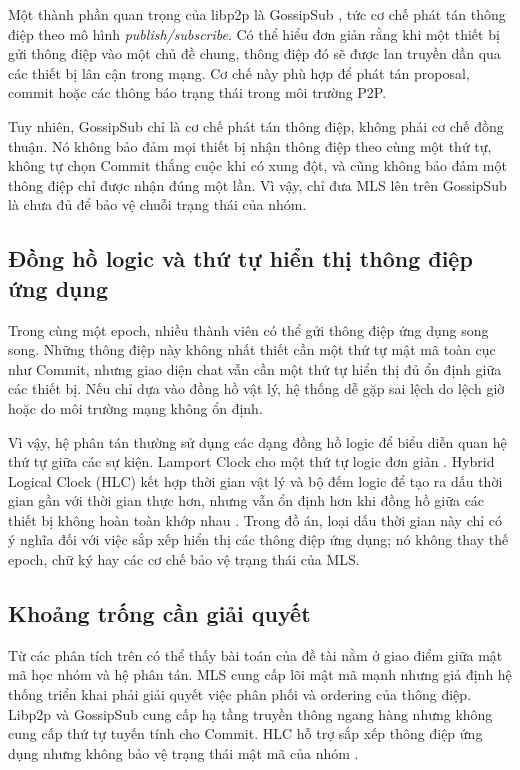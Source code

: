 \documentclass[../DoAn.tex]{subfiles}
\begin{document}
Một thành phần quan trọng của libp2p là GossipSub \cite{vyzovitis2020gossipsub}, tức cơ chế phát tán thông điệp theo mô hình \textit{publish/subscribe}. Có thể hiểu đơn giản rằng khi một thiết bị gửi thông điệp vào một chủ đề chung, thông điệp đó sẽ được lan truyền dần qua các thiết bị lân cận trong mạng. Cơ chế này phù hợp để phát tán proposal, commit hoặc các thông báo trạng thái trong môi trường P2P.

Tuy nhiên, GossipSub chỉ là cơ chế phát tán thông điệp, không phải cơ chế đồng thuận. Nó không bảo đảm mọi thiết bị nhận thông điệp theo cùng một thứ tự, không tự chọn Commit thắng cuộc khi có xung đột, và cũng không bảo đảm một thông điệp chỉ được nhận đúng một lần. Vì vậy, chỉ đưa MLS lên trên GossipSub là chưa đủ để bảo vệ chuỗi trạng thái của nhóm.

\subsection{Đồng hồ logic và thứ tự hiển thị thông điệp ứng dụng}

Trong cùng một epoch, nhiều thành viên có thể gửi thông điệp ứng dụng song song. Những thông điệp này không nhất thiết cần một thứ tự mật mã toàn cục như Commit, nhưng giao diện chat vẫn cần một thứ tự hiển thị đủ ổn định giữa các thiết bị. Nếu chỉ dựa vào đồng hồ vật lý, hệ thống dễ gặp sai lệch do lệch giờ hoặc do môi trường mạng không ổn định.

Vì vậy, hệ phân tán thường sử dụng các dạng đồng hồ logic để biểu diễn quan hệ thứ tự giữa các sự kiện. Lamport Clock cho một thứ tự logic đơn giản \cite{lamport1978}. Hybrid Logical Clock (HLC) kết hợp thời gian vật lý và bộ đếm logic để tạo ra dấu thời gian gần với thời gian thực hơn, nhưng vẫn ổn định hơn khi đồng hồ giữa các thiết bị không hoàn toàn khớp nhau \cite{kulkarni2014hlc}. Trong đồ án, loại dấu thời gian này chỉ có ý nghĩa đối với việc sắp xếp hiển thị các thông điệp ứng dụng; nó không thay thế epoch, chữ ký hay các cơ chế bảo vệ trạng thái của MLS.

\subsection{Khoảng trống cần giải quyết}

Từ các phân tích trên có thể thấy bài toán của đề tài nằm ở giao điểm giữa mật mã học nhóm và hệ phân tán. MLS cung cấp lõi mật mã mạnh nhưng giả định hệ thống triển khai phải giải quyết việc phân phối và ordering của thông điệp. Libp2p và GossipSub cung cấp hạ tầng truyền thông ngang hàng nhưng không cung cấp thứ tự tuyến tính cho Commit. HLC hỗ trợ sắp xếp thông điệp ứng dụng nhưng không bảo vệ trạng thái mật mã của nhóm \cite{rfc9750,libp2p2026doc,kulkarni2014hlc}.
\end{document}
